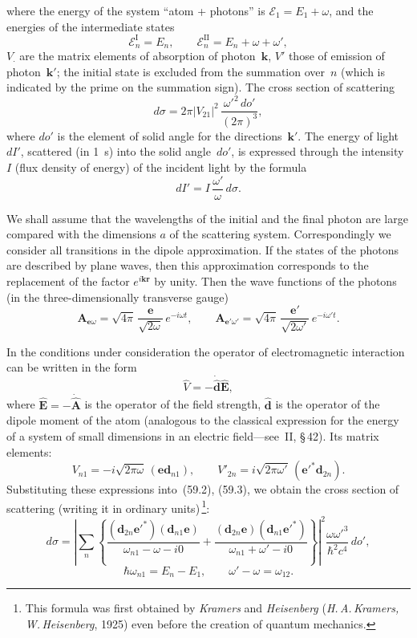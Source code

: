 where the energy of the system ``atom + photons'' is $\mathcal{E}_1 = E_1 + \omega$, and the energies of the intermediate states
\[
\mathcal{E}^{\mathrm{I}}_n = E_n,\qquad \mathcal{E}^{\mathrm{II}}_n = E_n + \omega + \omega',
\]
$V_\cdot$ are the matrix elements of absorption of photon~$\mathbf{k}$, $V'$ those of emission of photon~$\mathbf{k}'$; the initial state is excluded from the summation over~$n$ (which is indicated by the prime on the summation sign). The cross section of scattering
\begin{equation}
d\sigma = 2\pi|V_{21}|^2\,\frac{\omega'^2\,do'}{(2\pi)^3},
\tag{59.3}
\end{equation}
where $do'$ is the element of solid angle for the directions~$\mathbf{k}'$. The energy of light $dI'$, scattered (in 1~s) into the solid angle~$do'$, is expressed through the intensity~$I$ (flux density of energy) of the incident light by the formula
\[
dI' = I\,\frac{\omega'}{\omega}\,d\sigma.
\]

We shall assume that the wavelengths of the initial and the final photon are large compared with the dimensions $a$ of the scattering system. Correspondingly we consider all transitions in the dipole approximation. If the states of the photons are described by plane waves, then this approximation corresponds to the replacement of the factor $e^{i\mathbf{k}\mathbf{r}}$ by unity. Then the wave functions of the photons (in the three-dimensionally transverse gauge)
\[
\mathbf{A}_{\mathbf{e}\omega} = \sqrt{4\pi}\,\frac{\mathbf{e}}{\sqrt{2\omega}}\,e^{-i\omega t},\qquad \mathbf{A}_{\mathbf{e}'\omega'} = \sqrt{4\pi}\,\frac{\mathbf{e}'}{\sqrt{2\omega'}}\,e^{-i\omega't}.
\]

In the conditions under consideration the operator of electromagnetic interaction can be written in the form
\begin{equation}
\hat{V} = -\dot{\hat{\mathbf{d}}}\hat{\mathbf{E}},
\tag{59.4}
\end{equation}
where $\hat{\mathbf{E}} = -\dot{\hat{\mathbf{A}}}$ is the operator of the field strength, $\hat{\mathbf{d}}$ is the operator of the dipole moment of the atom (analogous to the classical expression for the energy of a system of small dimensions in an electric field---see~II, \S\,42). Its matrix elements:
\[
V_{n1} = -i\sqrt{2\pi\omega}\,(\mathbf{e}\mathbf{d}_{n1}),\qquad V'_{2n} = i\sqrt{2\pi\omega'}\,(\mathbf{e}'^*\mathbf{d}_{2n}).
\]
Substituting these expressions into~(59.2), (59.3), we obtain the cross section of scattering (writing it in ordinary units)\,\footnote{This formula was first obtained by \textit{Kramers} and \textit{Heisenberg} (\textit{H.\,A.\,Kramers, W.\,Heisenberg}, 1925) even before the creation of quantum mechanics.}:
\begin{equation}
d\sigma = \left|\sum_n\left\{\frac{(\mathbf{d}_{2n}\mathbf{e}'^*)(\mathbf{d}_{n1}\mathbf{e})}{\omega_{n1} - \omega - i0} + \frac{(\mathbf{d}_{2n}\mathbf{e})(\mathbf{d}_{n1}\mathbf{e}'^*)}{\omega_{n1} + \omega' - i0}\right\}\right|^2\frac{\omega\omega'^3}{\hbar^2c^4}\,do',
\tag{59.5}
\end{equation}
\[
\hbar\omega_{n1} = E_n - E_1,\qquad \omega' - \omega = \omega_{12}.
\]


